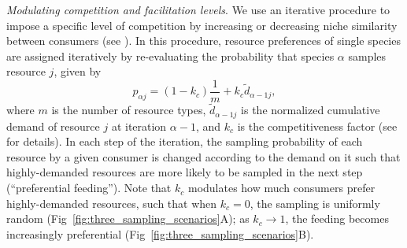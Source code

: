 \documentclass[10pt,letterpaper]{article}
\begin{document}
\textit{Modulating competition and facilitation levels}.  We use an iterative procedure to impose a specific level of competition by increasing or decreasing niche similarity between consumers (see ). In this procedure, resource preferences of single species are assigned iteratively by re-evaluating the probability that species $\alpha$ samples resource $j$, given by
\begin{equation}\label{eq:sampling_probability}
	p_{\alpha j}= (1-k_c) \frac{1}{m}  + k_c \tilde{d}_{\alpha  -1j},
\end{equation}
where $m$ is the number of resource types, $\tilde{d}_{\alpha  -1j}$ is the normalized cumulative demand of resource $j$ at iteration $\alpha - 1$, and $k_c$ is the competitiveness factor (see  for details). In each step of the iteration, the sampling probability of each resource by a given consumer is changed according to the demand on it such that highly-demanded resources are more likely to be sampled in the next step (``preferential feeding''). Note that $k_c$ modulates how much consumers prefer highly-demanded resources, such that when $k_c = 0$, the sampling is uniformly random (Fig~\ref{fig:three_sampling_scenarios}A); as $k_c \rightarrow 1$, the feeding becomes increasingly preferential (Fig~\ref{fig:three_sampling_scenarios}B).
\end{document}

